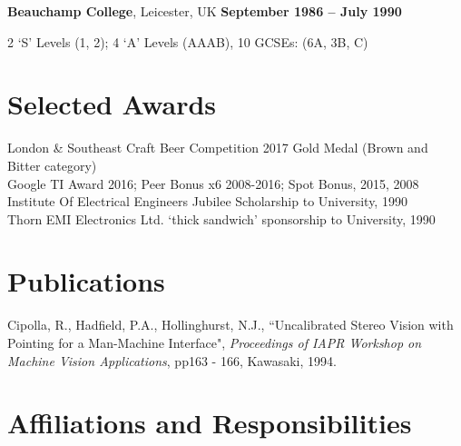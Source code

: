 \documentclass[line]{resume}
\begin{document}
\begin{resume}
    \textbf{Beauchamp College}, Leicester, UK\hfill \textbf{ September 1986 -- July 1990}\vspace{-3mm}\\\vspace{-1mm}%
    \begin{list2}
        \item 2 `S' Levels (1, 2); 4 `A' Levels (AAAB), 10 GCSEs: (6A, 3B, C)
    \end{list2}\vspace{-1.5mm}
 
    \section{\mysidestyle Selected Awards} 

    London \& Southeast Craft Beer Competition 2017 Gold Medal (Brown and Bitter category)            \vspace{0.5mm}\\%
    Google TI Award 2016; Peer Bonus x6 2008-2016; Spot Bonus, 2015, 2008                             \vspace{0.5mm}\\%
    Institute Of Electrical Engineers Jubilee Scholarship to University, 1990                         \vspace{0.5mm}\\%
    Thorn EMI Electronics Ltd. `thick sandwich' sponsorship to University, 1990

    \section{\mysidestyle Publications}

    Cipolla, R., Hadfield, P.A., Hollinghurst, N.J.,
    ``Uncalibrated Stereo Vision with Pointing for a Man-Machine Interface",
    \textsl{Proceedings of IAPR Workshop on Machine Vision Applications}, pp163 - 166, Kawasaki, 1994.

    \section{\mysidestyle Affiliations and Responsibilities}


\end{resume}
\end{document}
